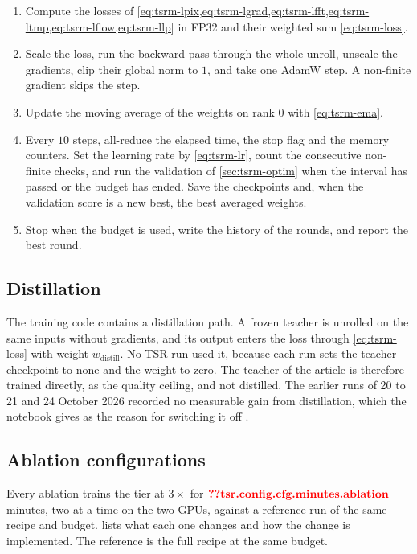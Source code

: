 \begin{enumerate}
\item Compute the losses of \cref{eq:tsrm-lpix,eq:tsrm-lgrad,eq:tsrm-lfft,eq:tsrm-ltmp,eq:tsrm-lflow,eq:tsrm-llp} in FP32 and their weighted sum \cref{eq:tsrm-loss}.
\item Scale the loss, run the backward pass through the whole unroll, unscale the gradients, clip their global norm to $1$, and take one AdamW step. A non-finite gradient skips the step.
\item Update the moving average of the weights on rank $0$ with \cref{eq:tsrm-ema}.
\item Every $10$ steps, all-reduce the elapsed time, the stop flag and the memory counters. Set the learning rate by \cref{eq:tsrm-lr}, count the consecutive non-finite checks, and run the validation of \cref{sec:tsrm-optim} when the interval has passed or the budget has ended. Save the checkpoints and, when the validation score is a new best, the best averaged weights.
\item Stop when the budget is used, write the history of the rounds, and report the best round.
\end{enumerate}

\subsection{Distillation}\label{sec:tsrm-distill}

The training code contains a distillation path. A frozen teacher is unrolled on the same inputs without gradients, and its output enters the loss through \cref{eq:tsrm-loss} with weight $w_\mathrm{distill}$. No TSR run used it, because each run sets the teacher checkpoint to none and the weight to zero. The teacher of the article is therefore trained directly, as the quality ceiling, and not distilled. The earlier runs of 20 to 21 and 24 October 2026 recorded no measurable gain from distillation, which the notebook gives as the reason for switching it off \Preliminary.

\subsection{Ablation configurations}\label{sec:tsrm-abl}

Every ablation trains the  tier at $3\times$ for $\Res{tsr.config.cfg.minutes.ablation}$ minutes, two at a time on the two GPUs, against a reference run of the same recipe and budget.  lists what each one changes and how the change is implemented. The reference is the full recipe at the same budget.

